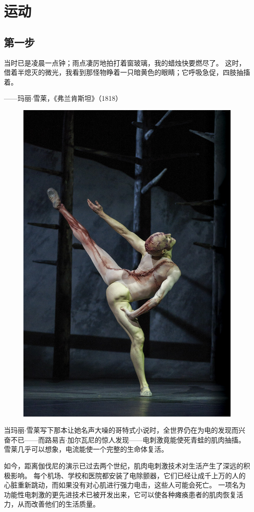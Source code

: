 \hypersetup{bookmarksopen=false}

\part{运动}

\chapter{第一步} \label{chap:chap1}

当时已是凌晨一点钟；雨点凄厉地拍打着窗玻璃，我的蜡烛快要燃尽了。
这时，借着半熄灭的微光，我看到那怪物睁着一只暗黄色的眼睛；它呼吸急促，四肢抽搐着。

\begin{flushright}
	——玛丽$\cdot$雪莱，《弗兰肯斯坦》（1818）\\
\end{flushright}


\begin{figure}[!htb]
	\centering
	\includegraphics[width=0.5\linewidth]{chap1/1_0}
	\caption*{ \label{fig:1_0}}
\end{figure}

当玛丽$\cdot$雪莱写下那本让她名声大噪的哥特式小说时，全世界仍在为电的发现而兴奋不已——而路易吉$\cdot$加尔瓦尼的惊人发现——电刺激竟能使死青蛙的肌肉抽搐。
雪莱几乎可以想象，电流能使一个完整的生命体复活。


如今，距离伽伐尼的演示已过去两个世纪，肌肉电刺激技术对生活产生了深远的积极影响。
每个机场、学校和医院都安装了电除颤器，它们已经让成千上万的人的心脏重新跳动，而如果没有对心肌进行强力电击，这些人可能会死亡。
一项名为功能性电刺激的更先进技术已被开发出来，它可以使各种瘫痪患者的肌肉恢复活力，从而改善他们的生活质量。


